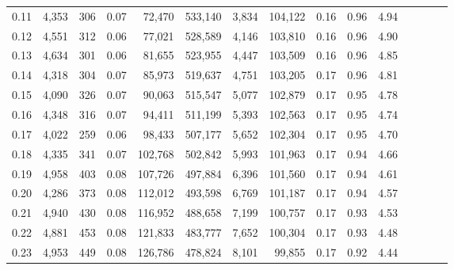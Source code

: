 \begin{tabular}{rrrcrrrrrrrrrrr}
0.11 &   4,353 &    306 &                                       0.07 &   72,470 &  533,140 &    3,834 &  104,122 &  0.16 &  0.96 &                         4.94 \\
0.12 &   4,551 &    312 &                                       0.06 &   77,021 &  528,589 &    4,146 &  103,810 &  0.16 &  0.96 &                         4.90 \\
0.13 &   4,634 &    301 &                                       0.06 &   81,655 &  523,955 &    4,447 &  103,509 &  0.16 &  0.96 &                         4.85 \\
0.14 &   4,318 &    304 &                                       0.07 &   85,973 &  519,637 &    4,751 &  103,205 &  0.17 &  0.96 &                         4.81 \\
0.15 &   4,090 &    326 &                                       0.07 &   90,063 &  515,547 &    5,077 &  102,879 &  0.17 &  0.95 &                         4.78 \\
0.16 &   4,348 &    316 &                                       0.07 &   94,411 &  511,199 &    5,393 &  102,563 &  0.17 &  0.95 &                         4.74 \\
0.17 &   4,022 &    259 &                                       0.06 &   98,433 &  507,177 &    5,652 &  102,304 &  0.17 &  0.95 &                         4.70 \\
0.18 &   4,335 &    341 &                                       0.07 &  102,768 &  502,842 &    5,993 &  101,963 &  0.17 &  0.94 &                         4.66 \\
0.19 &   4,958 &    403 &                                       0.08 &  107,726 &  497,884 &    6,396 &  101,560 &  0.17 &  0.94 &                         4.61 \\
0.20 &   4,286 &    373 &                                       0.08 &  112,012 &  493,598 &    6,769 &  101,187 &  0.17 &  0.94 &                         4.57 \\
0.21 &   4,940 &    430 &                                       0.08 &  116,952 &  488,658 &    7,199 &  100,757 &  0.17 &  0.93 &                         4.53 \\
0.22 &   4,881 &    453 &                                       0.08 &  121,833 &  483,777 &    7,652 &  100,304 &  0.17 &  0.93 &                         4.48 \\
0.23 &   4,953 &    449 &                                       0.08 &  126,786 &  478,824 &    8,101 &   99,855 &  0.17 &  0.92 &                         4.44 \\

\end{tabular}
